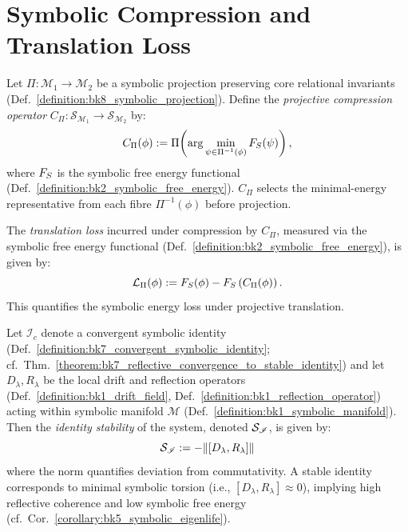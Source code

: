 \section[Symbolic Compression]{Symbolic Compression and Translation Loss}
\label{sec:bk8_symbolic_compression}
\begin{definition}
\label{definition:bk8_projective_compression_operator}
Let $\Pi : \mathcal{M}_1 \to \mathcal{M}_2$ be a symbolic projection preserving core relational invariants (Def.~\ref{definition:bk8_symbolic_projection}).  
Define the \emph{projective compression operator} $C_\Pi : \mathscr{S}_{\mathcal{M}_1} \to \mathscr{S}_{\mathcal{M}_2}$ by:
\[
C_\Pi(\phi) := \Pi\!\left( \arg\min_{\psi \in \Pi^{-1}(\phi)} F_S(\psi) \right),
\]
where $F_S$ is the symbolic free energy functional (Def.~\ref{definition:bk2_symbolic_free_energy}).  
$C_\Pi$ selects the minimal-energy representative from each fibre $\Pi^{-1}(\phi)$ before projection.
\end{definition}
\begin{definition}
\label{definition:bk8_translation_loss}
The \emph{translation loss} incurred under compression by $C_\Pi$, measured via the symbolic free energy functional (Def.~\ref{definition:bk2_symbolic_free_energy}), is given by:
\[
\mathcal{L}_\Pi(\phi) := F_S(\phi) - F_S\left(C_\Pi(\phi)\right).
\]
This quantifies the symbolic energy loss under projective translation.
\end{definition}
\begin{definition}
\label{definition:bk8_identitystability}
Let \( \mathscr{I}_c \) denote a convergent symbolic identity (Def.~\ref{definition:bk7_convergent_symbolic_identity}; cf.~Thm.~\ref{theorem:bk7_reflective_convergence_to_stable_identity}) and let \( D_\lambda, R_\lambda \) be the local drift and reflection operators (Def.~\ref{definition:bk1_drift_field}, Def.~\ref{definition:bk1_reflection_operator}) acting within symbolic manifold \( \mathcal{M} \) (Def.~\ref{definition:bk1_symbolic_manifold}). Then the \emph{identity stability} of the system, denoted \( \mathcal{S}_{\mathscr{I}} \), is given by:
\[
\mathcal{S}_{\mathscr{I}} := -\|[D_\lambda, R_\lambda]\|
\]
where the norm quantifies deviation from commutativity. A stable identity corresponds to minimal symbolic torsion (i.e., \([D_\lambda, R_\lambda] \approx 0\)), implying high reflective coherence and low symbolic free energy (cf.~Cor.~\ref{corollary:bk5_symbolic_eigenlife}).
\end{definition}
